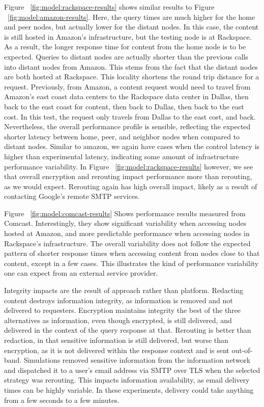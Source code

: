 Figure ~\ref{fig:model:rackspace-results} shows similar results to Figure ~\ref{fig:model:amazon-results}.  Here, the query times are much higher for the home and peer nodes, but actually lower for the distant nodes.  In this case, the content is still hosted in Amazon's infrastructure, but the testing node is at Rackspace.  As a result, the longer response time for content from the home node is to be expected.  Queries to distant nodes are actually shorter than the previous calls into distant nodes from Amazon.  This stems from the fact that the distant nodes are both hosted at Rackspace.  This locality shortens the round trip distance for a request.  Previously, from Amazon, a content request would need to travel from Amazon's east coast data centers to the Rackspace data center in Dallas, then back to the east coast for content, then back to Dallas, then back to the east cost.  In this test, the request only travels from Dallas to the east cost, and back.  Nevertheless, the overall performance profile is sensible, reflecting the expected shorter latency between home, peer, and neighbor nodes when compared to distant nodes.  Similar to amazon, we again have cases when the control latency is higher than experimental latency, indicating some amount of infrastructure performance variability.  In Figure ~\ref{fig:model:rackspace-results} however, we see that overall encryption and rerouting impact performance more than rerouting, as we would expect.  Rerouting again has high overall impact, likely as a result of contacting Google's remote SMTP services.

Figure ~\ref{fig:model:comcast-results} Shows performance results measured from Comcast.  Interestingly, they show significant variability when accessing nodes hosted at Amazon, and more predictable performance when accessing nodes in Rackspace's infrastructure.  The overall variability does not follow the expected pattern of shorter response times when accessing content from nodes close to that content, except in a few cases.  This illustrates the kind of performance variability one can expect from an external service provider.

Integrity impacts are the result of approach rather than platform.  Redacting content destroys information integrity, as information is removed and not delivered to requesters.  Encryption maintains integrity the best of the three alternatives as information, even though encrypted, is still delivered, and delivered in the context of the query response at that.  Rerouting is better than redaction, in that sensitive information is still delivered, but worse than encryption, as it is not delivered within the response context and is sent out-of-band. Simulations removed sensitive information from the information network and dispatched it to a user's email address via SMTP over TLS when the selected strategy was rerouting.  This impacts information availability, as email delivery times can be highly variable.  In these experiments, delivery could take anything from a few seconds to a few minutes.

